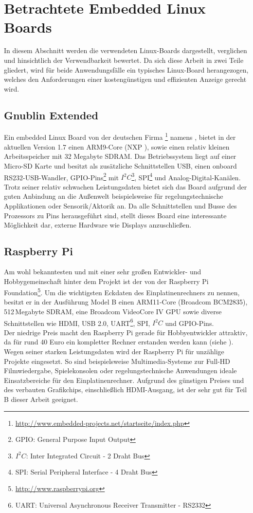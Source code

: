 \section{Betrachtete Embedded Linux Boards}
\label{cha:betrachtete_linux_boards}
In diesem Abschnitt werden die verwendeten Linux-Boards dargestellt, verglichen und hinsichtlich der Verwendbarkeit bewertet. Da sich diese Arbeit in zwei Teile gliedert, wird für beide Anwendungsfälle ein typisches Linux-Board herangezogen, welches den Anforderungen einer kostengünstigen und effizienten Anzeige gerecht wird.
\subsection{Gnublin Extended}
\label{cha:gnublin_extended}
Ein embedded Linux Board von der deutschen Firma \footnote{\url{http://www.embedded-projects.net/startseite/index.php}} namens , bietet in der aktuellen Version 1.7 einen ARM9-Core (NXP ), sowie einen relativ kleinen Arbeitsspeicher mit 32 Megabyte SDRAM. Das Betriebssystem liegt auf einer Micro-SD Karte und besitzt als zusätzliche Schnittstellen USB, einen onboard RS232-USB-Wandler, GPIO-Pins\footnote{GPIO: General Purpose Input Output} mit $I^2C$\footnote{$I^2C$: Inter Integrated Circuit - 2 Draht Bus}, SPI\footnote{SPI: Serial Peripheral Interface - 4 Draht Bus} und Analog-Digital-Kanälen. Trotz seiner relativ schwachen Leistungsdaten bietet sich das Board aufgrund der guten Anbindung an die Außenwelt beispielsweise für regelungstechnische Applikationen oder Sensorik/Aktorik an.
Da alle Schnittstellen und Busse des Prozessors zu Pins herausgeführt sind, stellt dieses Board eine interessante Möglichkeit dar, externe Hardware wie Displays anzuschließen. 
\subsection{Raspberry Pi}
\label{cha:raspberry}
Am wohl bekanntesten und mit einer sehr großen Entwickler- und Hobbygemeinschaft hinter dem Projekt ist der  von der Raspberry Pi Foundation\footnote{\url{http://www.raspberrypi.org}}. Um die wichtigsten Eckdaten des Einplatinenrechners zu nennen, besitzt er in der Ausführung Model B einen ARM11-Core (Broadcom BCM2835), 512\,Megabyte SDRAM, eine Broadcom VideoCore IV GPU sowie diverse Schnittstellen wie HDMI, USB 2.0, UART\footnote{UART: Universal Asynchronous Receiver Transmitter - RS2332}, SPI, $I^2C$ und GPIO-Pins.\\
Der niedrige Preis macht den Raspberry Pi gerade für Hobbyentwickler attraktiv, da für rund 40 Euro ein kompletter Rechner erstanden werden kann (siehe \cite{elektroniknet2013}). Wegen seiner starken Leistungsdaten wird der Raspberry Pi für unzählige Projekte eingesetzt. So sind beispielsweise Multimedia-Systeme zur Full-HD Filmwiedergabe, Spielekonsolen oder regelungstechnische Anwendungen ideale Einsatzbereiche für den Einplatinenrechner.
Aufgrund des günstigen Preises und des verbauten Grafikchips, einschließlich HDMI-Ausgang, ist der  sehr gut für Teil B dieser Arbeit geeignet.
